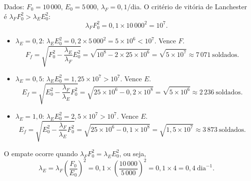 Dados: $F_0=10\,000$, $E_0=5\,000$, $\lambda_F=0{,}1$/dia.
O critério de vitória de Lanchester é $\lambda_F F_0^2 > \lambda_E E_0^2$:
\[
\lambda_F F_0^2 = 0{,}1\times10\,000^2 = 10^7.
\]
\begin{itemize}
\item \textbf{$\lambda_E=0{,}2$}: $\lambda_E E_0^2 = 0{,}2\times5\,000^2=5\times10^6 < 10^7$. Vence $F$.
\[
F_f = \sqrt{F_0^2 - \frac{\lambda_E}{\lambda_F}E_0^2} = \sqrt{10^8 - 2\times25\times10^6} = \sqrt{5\times10^7} \approx 7\,071\ \text{soldados}.
\]
\item \textbf{$\lambda_E=0{,}5$}: $\lambda_E E_0^2 = 1{,}25\times10^7 > 10^7$. Vence $E$.
\[
E_f = \sqrt{E_0^2 - \frac{\lambda_F}{\lambda_E}F_0^2} = \sqrt{25\times10^6 - 0{,}2\times10^8} = \sqrt{5\times10^6} \approx 2\,236\ \text{soldados}.
\]
\item \textbf{$\lambda_E=1{,}0$}: $\lambda_E E_0^2 = 2{,}5\times10^7 > 10^7$. Vence $E$.
\[
E_f = \sqrt{E_0^2 - \frac{\lambda_F}{\lambda_E}F_0^2} = \sqrt{25\times10^6 - 0{,}1\times10^8} = \sqrt{1{,}5\times10^7} \approx 3\,873\ \text{soldados}.
\]
\end{itemize}
O empate ocorre quando $\lambda_F F_0^2 = \lambda_E E_0^2$, ou seja,
\[
\lambda_E = \lambda_F\left(\frac{F_0}{E_0}\right)^{2} = 0{,}1\times\left(\frac{10\,000}{5\,000}\right)^{2} = 0{,}1\times4 = 0{,}4\ \text{dia}^{-1}.
\]